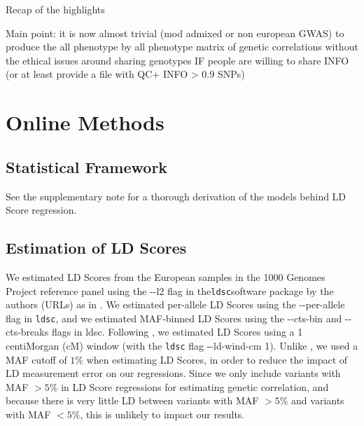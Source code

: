 \documentclass[11pt]{article}
\numberwithin{equation}{section}
\begin{document}
Recap of the highlights

Main point: it is now almost trivial (mod admixed or non european GWAS)
to produce the all phenotype by all phenotype matrix of genetic correlations without 
the ethical issues around sharing genotypes IF people are willing to share INFO
(or at least provide a file with QC+ INFO > 0.9 SNPs)

\newpage
\section{Online Methods}\label{Online Methods}

\subsection{Statistical Framework}

See the supplementary note for a thorough derivation of the models behind LD Score regression.

\subsection{Estimation of LD Scores}

We estimated LD Scores from the European samples in the 1000 Genomes Project \cite{10002012integrated}
reference panel using the {-}{-}l2 flag in the\texttt{ldsc}software package by the authors (URLs) as in \cite{buliksullivan2014}.
We estimated per-allele LD Scores using the {-}{-}per-allele flag in \texttt{ldsc}, and
we estimated MAF-binned LD Scores using the {-}{-}cts-bin and {-}{-}cts-breaks flags in ldsc.
Following \cite{buliksullivan2014}, we estimated LD Scores using a 1 centiMorgan (cM) window
(with the \texttt{ldsc} flag {-}{-}ld-wind-cm 1).
Unlike \cite{buliksullivan2014}, we used a MAF cutoff of $1\%$ when estimating LD Scores,
in order to reduce the impact of LD measurement error on our regressions.
Since we only include variants with MAF $> 5\%$ in LD Score regressions for estimating genetic correlation,
and because there is very little LD between variants with MAF $> 5\%$ and variants with MAF $< 5\%$, 
this is unlikely to impact our results. 
\end{document}
